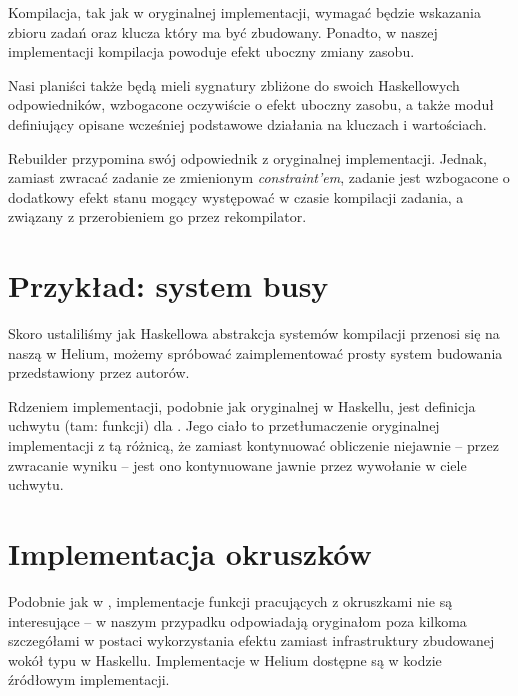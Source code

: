 Kompilacja, tak jak w oryginalnej implementacji, wymagać będzie wskazania zbioru zadań oraz klucza który ma być zbudowany. Ponadto, w  naszej implementacji kompilacja powoduje efekt uboczny zmiany zasobu.

Nasi planiści także będą mieli sygnatury zbliżone do swoich Haskellowych odpowiedników, wzbogacone oczywiście o efekt uboczny zasobu, a także moduł definiujący opisane wcześniej podstawowe działania na kluczach i wartościach.



Rebuilder przypomina swój odpowiednik z oryginalnej implementacji. Jednak, zamiast zwracać zadanie ze zmienionym \textit{constraint'em}, zadanie jest wzbogacone o dodatkowy efekt stanu mogący występować w czasie kompilacji zadania, a związany z przerobieniem go przez rekompilator.

\section{Przykład: system busy}

Skoro ustaliliśmy jak Haskellowa abstrakcja systemów kompilacji przenosi się na naszą w Helium, możemy spróbować zaimplementować prosty system budowania  przedstawiony przez autorów.



Rdzeniem implementacji, podobnie jak oryginalnej w Haskellu, jest definicja uchwytu (tam: funkcji) dla . Jego ciało to przetłumaczenie oryginalnej implementacji z tą różnicą, że zamiast kontynuować obliczenie niejawnie -- przez zwracanie wyniku -- jest ono kontynuowane jawnie przez wywołanie  w ciele uchwytu.

\section{Implementacja okruszków}

Podobnie jak w \BSaLC{}, implementacje funkcji pracujących z okruszkami nie są interesujące -- w naszym przypadku odpowiadają oryginałom poza kilkoma szczegółami w postaci wykorzystania efektu  zamiast infrastruktury zbudowanej wokół typu  w Haskellu. Implementacje w Helium dostępne są w kodzie źródłowym implementacji.%

